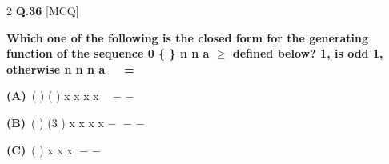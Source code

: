 \documentclass[a4paper,10pt,twoside]{article}
\begin{document}
\begin{multicols}{2}
\noindent\textbf{Q.36} \hfill {\footnotesize\textsf{[MCQ]}}
\par\vspace{2pt}
{\bfseries Which one of the following is the closed form for the generating function of the
sequence
0
\{
\}
n
n
a
$\ge$
defined below?
1,
is odd
1,
otherwise
n
n
n
a


=
 \par}
\par\vspace{2pt}\noindent
\textbf{(A)}~( \newline ) \newline ( \newline )        \newline x \newline x \newline x \newline x \newline  \newline − \newline −\par\vspace{2pt}\noindent
\textbf{(B)}~( \newline )    \newline (3 \newline )    \newline x \newline x \newline x \newline x \newline − \newline − \newline −\par\vspace{2pt}\noindent
\textbf{(C)}~( \newline )       \newline x \newline x \newline x \newline − \newline −\par\vspace{2pt}\noindent

\end{multicols}
\end{document}
